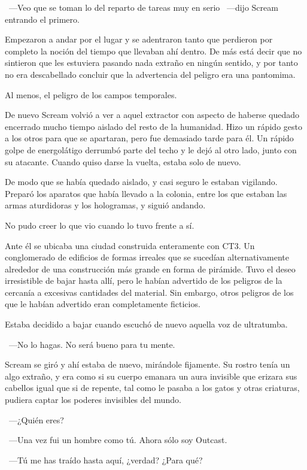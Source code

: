 ~---Veo que se toman lo del reparto de tareas muy en serio ~---dijo Scream entrando el primero.

Empezaron a andar por el lugar y se adentraron tanto que perdieron por completo la noción del tiempo que llevaban ahí dentro. De más está decir que no sintieron que les estuviera pasando nada extraño en ningún sentido, y por tanto no era descabellado concluir que la advertencia del peligro era una pantomima.

Al menos, el peligro de los campos temporales.

De nuevo Scream volvió a ver a aquel extractor con aspecto de haberse quedado encerrado mucho tiempo aislado del resto de la humanidad. Hizo un rápido gesto a los otros para que se apartaran, pero fue demasiado tarde para él. Un rápido golpe de energolátigo derrumbó parte del techo y le dejó al otro lado, junto con su atacante. Cuando quiso darse la vuelta, estaba solo de nuevo.

De modo que se había quedado aislado, y casi seguro le estaban vigilando. Preparó los aparatos que había llevado a la colonia, entre los que estaban las armas aturdidoras y los hologramas, y siguió andando.

No pudo creer lo que vio cuando lo tuvo frente a sí.

Ante él se ubicaba una ciudad construida enteramente con CT3. Un conglomerado de edificios de formas irreales que se sucedían alternativamente alrededor de una construcción más grande en forma de pirámide. Tuvo el deseo irresistible de bajar hasta allí, pero le habían advertido de los peligros de la cercanía a excesivas cantidades del material. Sin embargo, otros peligros de los que le habían advertido eran completamente ficticios.

Estaba decidido a bajar cuando escuchó de nuevo aquella voz de ultratumba.

~---No lo hagas. No será bueno para tu mente.

Scream se giró y ahí estaba de nuevo, mirándole fijamente. Su rostro tenía un algo extraño, y era como si su cuerpo emanara un aura invisible que erizara sus cabellos igual que si de repente, tal como le pasaba a los gatos y otras criaturas, pudiera captar los poderes invisibles del mundo.

~---¿Quién eres?

~---Una vez fui un hombre como tú. Ahora sólo soy Outcast.

~---Tú me has traído hasta aquí, ¿verdad? ¿Para qué?

